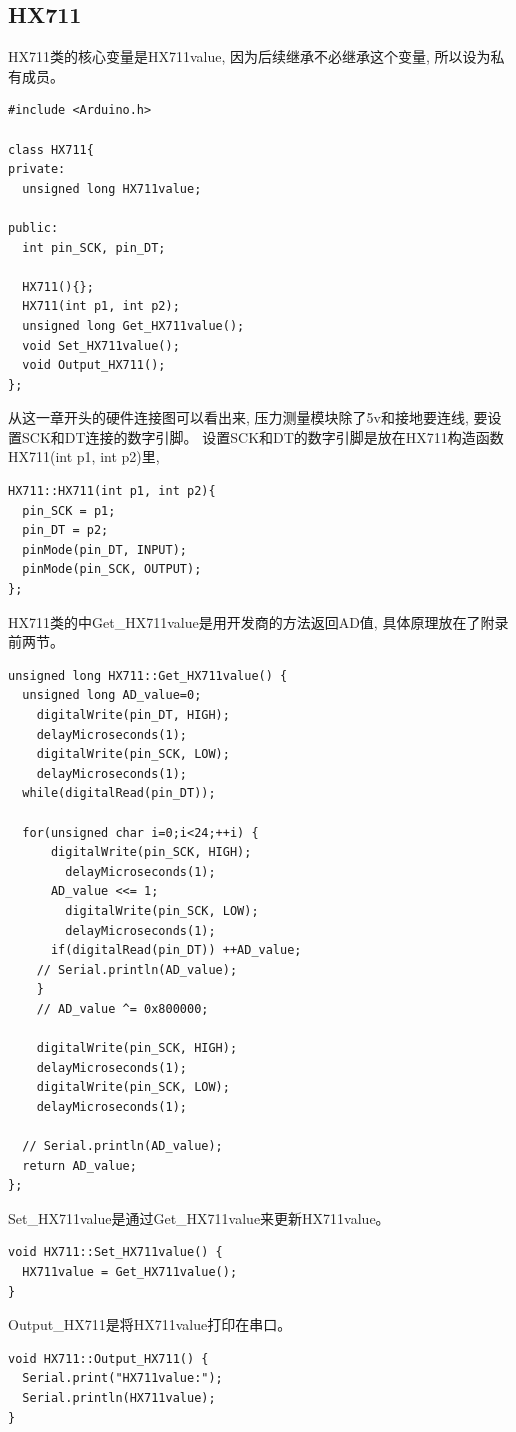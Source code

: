 \documentclass{article}
\begin{document}
\subsection{HX711}
HX711类的核心变量是HX711value, 因为后续继承不必继承这个变量, 所以设为私有成员。
\begin{lstlisting}
#include <Arduino.h>

class HX711{
private:
  unsigned long HX711value;

public:
  int pin_SCK, pin_DT;   

  HX711(){};
  HX711(int p1, int p2);
  unsigned long Get_HX711value();
  void Set_HX711value();
  void Output_HX711();
};
\end{lstlisting}

从这一章开头的硬件连接图可以看出来, 压力测量模块除了5v和接地要连线, 要设置SCK和DT连接的数字引脚。
设置SCK和DT的数字引脚是放在HX711构造函数HX711(int p1, int p2)里,
\begin{lstlisting}
HX711::HX711(int p1, int p2){
  pin_SCK = p1;
  pin_DT = p2;
  pinMode(pin_DT, INPUT);	
  pinMode(pin_SCK, OUTPUT);	
};  
\end{lstlisting}

HX711类的中Get\_HX711value是用开发商的方法返回AD值, 具体原理放在了附录前两节。
\begin{lstlisting}
unsigned long HX711::Get_HX711value() {
  unsigned long AD_value=0;
	digitalWrite(pin_DT, HIGH);
	delayMicroseconds(1);
	digitalWrite(pin_SCK, LOW);
	delayMicroseconds(1);
  while(digitalRead(pin_DT));
   
  for(unsigned char i=0;i<24;++i) {
	  digitalWrite(pin_SCK, HIGH); 
		delayMicroseconds(1);
	  AD_value <<= 1; 
		digitalWrite(pin_SCK, LOW); 
		delayMicroseconds(1);
	  if(digitalRead(pin_DT)) ++AD_value; 
    // Serial.println(AD_value);
	} 
	// AD_value ^= 0x800000;

 	digitalWrite(pin_SCK, HIGH); 
	delayMicroseconds(1);
	digitalWrite(pin_SCK, LOW); 
	delayMicroseconds(1);

  // Serial.println(AD_value);
  return AD_value;
};  
\end{lstlisting}

Set\_HX711value是通过Get\_HX711value来更新HX711value。
\begin{lstlisting}
void HX711::Set_HX711value() {
  HX711value = Get_HX711value();
}  
\end{lstlisting}

Output\_HX711是将HX711value打印在串口。
\begin{lstlisting}
void HX711::Output_HX711() {
  Serial.print("HX711value:");
  Serial.println(HX711value);
}  
\end{lstlisting}
\end{document}
